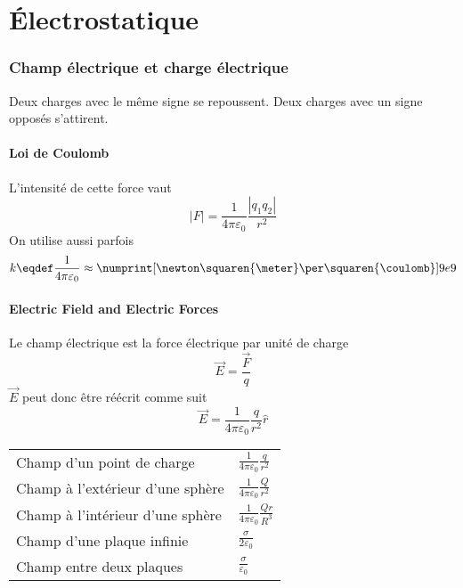 

\usepackage{amsmath}
\usepackage{amssymb}
\usepackage{amsthm}

\usepackage[squaren, Gray]{SIunits}
\usepackage{numprint}
\usepackage{array}
\usepackage{fancybox}
\usepackage{float}
\usepackage{colortbl}
\usepackage{makecell}
\usepackage{graphicx}
\usepackage{titlesec}
\usepackage{qtree}
\usepackage{tensor}
\usepackage{circuitikz}


\part{Électrostatique}
\section{Champ électrique et charge électrique}
Deux charges avec le même signe se repoussent.
Deux charges avec un signe opposés s'attirent.

\subsection{Loi de Coulomb}
L'intensité de cette force vaut
\[ |F| = \frac{1}{4\pi\varepsilon_0}\frac{|q_1q_2|}{r^2} \]
On utilise aussi parfois
\[ k \eqdef \frac{1}{4\pi\varepsilon_0} \approx
\numprint[\newton\squaren{\meter}\per\squaren{\coulomb}]{9e9} \]
\subsection{Electric Field and Electric Forces}
Le champ électrique est la force électrique par unité de charge
\[ \vec{E} = \frac{\vec{F}}{q} \]
$\vec{E}$ peut donc être réécrit comme suit
\[ \vec{E} = \frac{1}{4\pi\varepsilon_0}\frac{q}{r^2}\hat{r} \]
\begin{tabular}{ll}
	Champ d'un point de charge & \(\frac{1}{4\pi\varepsilon_0}\frac{q}{r^2}\)\\
	Champ à  l'extérieur d'une sphère & \(\frac{1}{4\pi\varepsilon_0}\frac{Q}{r^2}\)\\
	Champ à  l'intérieur d'une sphère & \(\frac{1}{4\pi\varepsilon_0}\frac{Qr}{R^3}\)\\
	Champ d'une plaque infinie & \(\frac{\sigma}{2\varepsilon_0}\)\\
	Champ entre deux plaques & \(\frac{\sigma}{\varepsilon_0}\)
\end{tabular}
